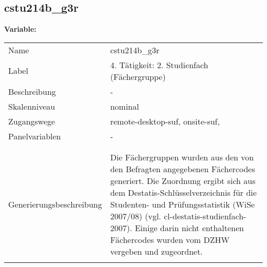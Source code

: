 	
	
	\subsection{cstu214b\_g3r}
	\label{subSection:cstu214b_g3r}

	\noindent\textbf{Variable:}\\
		\begin{tabular}{lL{11.3cm}}
			\label{tableVariable:cstu214b_g3r}
			Name & cstu214b\_g3r \\
			Label & 4. Tätigkeit: 2. Studienfach (Fächergruppe) \\
			Beschreibung & - \\
			Skalenniveau & nominal \\
			Zugangswege &
				remote-desktop-suf,
				onsite-suf,
 \\
			Panelvariablen & -
			 \\
			 \\
 \\
					Generierungsbeschreibung & Die Fächergruppen wurden aus den von den Befragten angegebenen Fächercodes generiert. Die Zuordnung ergibt sich aus dem Destatis-Schlüsselverzeichnis für die Studenten- und Prüfungsstatistik (WiSe 2007/08) (vgl. cl-destatis-studienfach-2007).  Einige darin nicht enthaltenen Fächercodes wurden vom DZHW vergeben und zugeordnet. 
				 \\	
			 \\
		\end{tabular}







